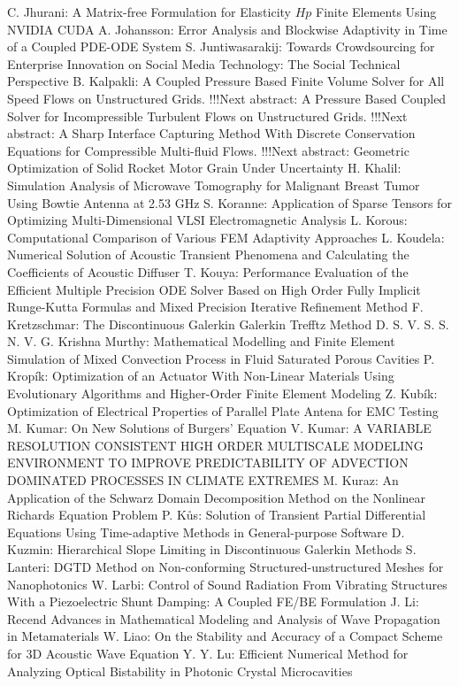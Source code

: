\documentclass[10pt, A4]{article}%
\begin{document}
{C. Jhurani}: {A Matrix-free Formulation for Elasticity $Hp$ Finite Elements Using NVIDIA CUDA}
{A. Johansson}: {Error Analysis and Blockwise Adaptivity in Time of a Coupled PDE-ODE System}
{S. Juntiwasarakij}: {Towards Crowdsourcing for Enterprise Innovation on Social Media Technology: The Social Technical Perspective}
{B. Kalpakli}: {A Coupled Pressure Based Finite Volume Solver for All Speed Flows on Unstructured Grids.       !!!Next abstract: A Pressure Based Coupled Solver for Incompressible Turbulent Flows on Unstructured Grids.       !!!Next abstract: A Sharp Interface Capturing Method With Discrete Conservation Equations for Compressible Multi-fluid Flows.       !!!Next abstract: Geometric Optimization of Solid Rocket Motor Grain Under Uncertainty}
{H. Khalil}: {Simulation Analysis of Microwave Tomography for Malignant Breast Tumor Using Bowtie Antenna at 2.53 GHz}
{S. Koranne}: {Application of Sparse Tensors for Optimizing Multi-Dimensional VLSI Electromagnetic Analysis}
{L. Korous}: {Computational Comparison of Various FEM Adaptivity Approaches}
{L. Koudela}: {Numerical Solution of Acoustic Transient Phenomena and Calculating the Coefficients of Acoustic Diffuser}
{T. Kouya}: {Performance Evaluation of the Efficient Multiple Precision ODE Solver Based on High Order Fully Implicit Runge-Kutta Formulas and Mixed Precision Iterative Refinement Method}
{F. Kretzschmar}: {The Discontinuous Galerkin Galerkin Trefftz Method}
{D. S. V. S. S. N. V. G. Krishna Murthy}: {Mathematical Modelling and Finite Element Simulation of Mixed Convection Process in Fluid Saturated Porous Cavities}
{P. Kropík}: {Optimization of an Actuator With Non-Linear Materials Using Evolutionary Algorithms and Higher-Order Finite Element Modeling}
{Z. Kubík}: {Optimization of Electrical Properties of Parallel Plate Antena for EMC Testing}
{M. Kumar}: {On New Solutions of Burgers' Equation}
{V. Kumar}: {A VARIABLE RESOLUTION CONSISTENT HIGH ORDER MULTISCALE MODELING ENVIRONMENT TO IMPROVE PREDICTABILITY OF ADVECTION DOMINATED PROCESSES IN CLIMATE EXTREMES}
{M. Kuraz}: {An Application of the Schwarz Domain Decomposition Method on the Nonlinear Richards Equation Problem}
{P. Kůs}: {Solution of Transient Partial Differential Equations Using Time-adaptive Methods in General-purpose Software}
{D. Kuzmin}: {Hierarchical Slope Limiting in  Discontinuous Galerkin Methods}
{S. Lanteri}: {DGTD  Method  on  Non-conforming  Structured-unstructured  Meshes  for Nanophotonics}
{W. Larbi}: {Control of Sound Radiation From Vibrating Structures With a Piezoelectric Shunt Damping: A Coupled FE/BE Formulation}
{J. Li}: {Recend Advances in Mathematical Modeling and Analysis of Wave Propagation in Metamaterials}
{W. Liao}: {On the Stability and Accuracy of a Compact Scheme for 3D Acoustic Wave Equation}
{Y. Y. Lu}: {Efficient Numerical Method for Analyzing Optical Bistability in Photonic Crystal Microcavities}
\end{document}
